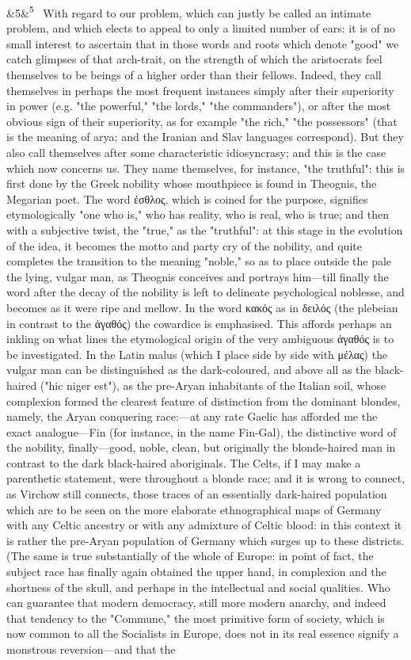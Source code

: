 \documentclass[12pt]{article}
\newcommand{\para}[1][]{\par\noindent\ifx&#1&\else\textsuperscript{\footnotesize #1}~\fi}
\begin{document}
\para[5] With regard to our problem, which can justly be called an intimate problem, and which elects to appeal to only a limited number of ears: it is of no small interest to ascertain that in those words and roots which denote "good" we catch glimpses of that arch-trait, on the strength of which the aristocrats feel themselves to be beings of a higher order than their fellows. Indeed, they call themselves in perhaps the most frequent instances simply after their superiority in power (e.g. "the powerful," "the lords," "the commanders"), or after the most obvious sign of their superiority, as for example "the rich," "the possessors" (that is the meaning of arya; and the Iranian and Slav languages correspond). But they also call themselves after some characteristic idiosyncrasy; and this is the case which now concerns us. They name themselves, for instance, "the truthful": this is first done by the Greek nobility whose mouthpiece is found in Theognis, the Megarian poet. The word ἐσθλος, which is coined for the purpose, signifies etymologically "one who is," who has reality, who is real, who is true; and then with a subjective twist, the "true," as the "truthful": at this stage in the evolution of the idea, it becomes the motto and party cry of the nobility, and quite completes the transition to the meaning "noble," so as to place outside the pale the lying, vulgar man, as Theognis conceives and portrays him---till finally the word after the decay of the nobility is left to delineate psychological noblesse, and becomes as it were ripe and mellow. In the word κακός as in δειλός (the plebeian in contrast to the ἀγαθός) the cowardice is emphasised. This affords perhaps an inkling on what lines the etymological origin of the very ambiguous ἀγαθός is to be investigated. In the Latin malus (which I place side by side with μέλας) the vulgar man can be distinguished as the dark-coloured, and above all as the black-haired ("hic niger est"), as the pre-Aryan inhabitants of the Italian soil, whose complexion formed the clearest feature of distinction from the dominant blondes, namely, the Aryan conquering race:---at any rate Gaelic has afforded me the exact analogue---Fin (for instance, in the name Fin-Gal), the distinctive word of the nobility, finally---good, noble, clean, but originally the blonde-haired man in contrast to the dark black-haired aboriginals. The Celts, if I may make a parenthetic statement, were throughout a blonde race; and it is wrong to connect, as Virchow still connects, those traces of an essentially dark-haired population which are to be seen on the more elaborate ethnographical maps of Germany with any Celtic ancestry or with any admixture of Celtic blood: in this context it is rather the pre-Aryan population of Germany which surges up to these districts. (The same is true substantially of the whole of Europe: in point of fact, the subject race has finally again obtained the upper hand, in complexion and the shortness of the skull, and perhaps in the intellectual and social qualities. Who can guarantee that modern democracy, still more modern anarchy, and indeed that tendency to the "Commune," the most primitive form of society, which is now common to all the Socialists in Europe, does not in its real essence signify a monstrous reversion---and that the 
\end{document}
